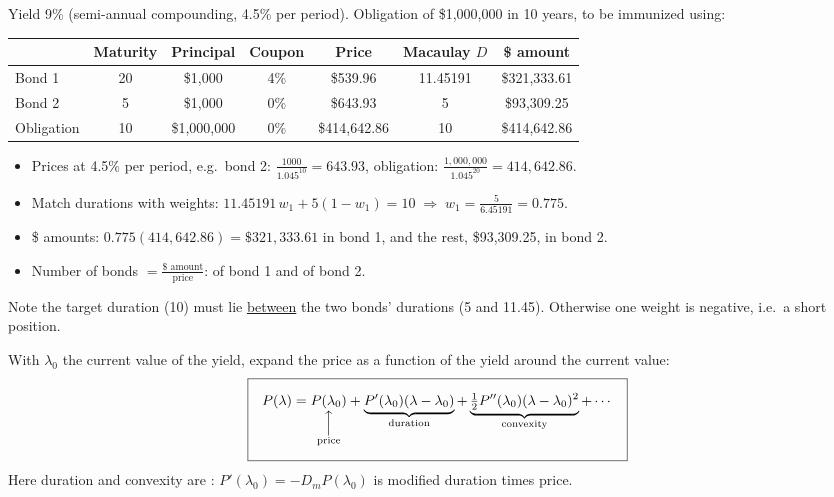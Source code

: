 \begin{example}
    Yield 9\% (semi-annual compounding, 4.5\% per period). Obligation of \$1,000,000 in 10 years, to be immunized using:
    \begin{center}
    \begin{tabular}{lcccccc}
        \toprule
        & Maturity & Principal & Coupon & Price & Macaulay $D$ & \$ amount\\
        \midrule
        Bond 1 & 20 & \$1,000 & 4\% & \$539.96 & 11.45191 & \$321,333.61\\
        Bond 2 & 5 & \$1,000 & 0\% & \$643.93 & 5 & \$93,309.25\\
        \midrule
        Obligation & 10 & \$1,000,000 & 0\% & \$414,642.86 & 10 & \$414,642.86\\
        \bottomrule
    \end{tabular}
    \end{center}
    \begin{itemize}
        \item Prices at 4.5\% per period, e.g.\ bond 2: $\frac{1000}{1.045^{10}} = 643.93$, obligation: $\frac{1{,}000{,}000}{1.045^{20}} = 414{,}642.86$.
        \item Match durations with weights: $11.45191\,w_1 + 5(1 - w_1) = 10 \;\Rightarrow\; w_1 = \frac{5}{6.45191} = 0.775$.
        \item \$ amounts: $0.775(414{,}642.86) = \$321{,}333.61$ in bond 1, and the rest, \$93,309.25, in bond 2.
        \item Number of bonds $= \frac{\$\text{ amount}}{\text{price}}$:  of bond 1 and  of bond 2.
    \end{itemize}
    Note the target duration (10) must lie \ul{between} the two bonds' durations (5 and 11.45). Otherwise one weight is negative, i.e.\ a short position.
\end{example}

With $\lambda_0$ the current value of the yield, expand the price as a function of the yield around the current value:
\[\boxed{P(\lambda) = \underset{\mathclap{\substack{\Big\uparrow\\\text{price}}}}{P(\lambda_0)} + \underbrace{P'(\lambda_0)(\lambda - \lambda_0)}_{\text{duration}} + \underbrace{\tfrac{1}{2}P''(\lambda_0)(\lambda - \lambda_0)^2}_{\text{convexity}} + \cdots}\]
Here duration and convexity are : $P'(\lambda_0) = -D_mP(\lambda_0)$ is modified duration times price.

